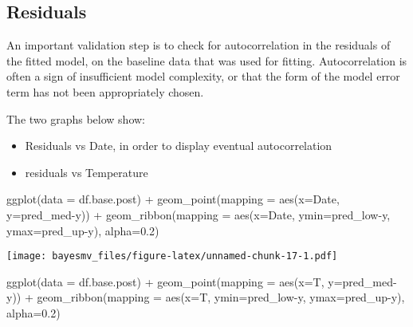 \documentclass[
]{article}
\newenvironment{Shaded}{\begin{snugshade}}{\end{snugshade}}
\newcommand{\AttributeTok}[1]{\textcolor[rgb]{0.77,0.63,0.00}{#1}}
\newcommand{\FloatTok}[1]{\textcolor[rgb]{0.00,0.00,0.81}{#1}}
\newcommand{\FunctionTok}[1]{\textcolor[rgb]{0.00,0.00,0.00}{#1}}
\newcommand{\NormalTok}[1]{#1}
\newcommand{\SpecialCharTok}[1]{\textcolor[rgb]{0.00,0.00,0.00}{#1}}
\providecommand{\tightlist}{%
  \setlength{\itemsep}{0pt}\setlength{\parskip}{0pt}}
\begin{document}
\hypertarget{residuals}{%
\subsection{Residuals}\label{residuals}}

An important validation step is to check for autocorrelation in the residuals of the fitted model, on the baseline data that was used for fitting. Autocorrelation is often a sign of insufficient model complexity, or that the form of the model error term has not been appropriately chosen.

The two graphs below show:

\begin{itemize}
\tightlist
\item
  Residuals vs Date, in order to display eventual autocorrelation
\item
  residuals vs Temperature
\end{itemize}

\begin{Shaded}
\begin{Highlighting}[]
\FunctionTok{ggplot}\NormalTok{(}\AttributeTok{data =}\NormalTok{ df.base.post) }\SpecialCharTok{+}
  \FunctionTok{geom\_point}\NormalTok{(}\AttributeTok{mapping =} \FunctionTok{aes}\NormalTok{(}\AttributeTok{x=}\NormalTok{Date, }\AttributeTok{y=}\NormalTok{pred\_med}\SpecialCharTok{{-}}\NormalTok{y)) }\SpecialCharTok{+}
  \FunctionTok{geom\_ribbon}\NormalTok{(}\AttributeTok{mapping =} \FunctionTok{aes}\NormalTok{(}\AttributeTok{x=}\NormalTok{Date, }\AttributeTok{ymin=}\NormalTok{pred\_low}\SpecialCharTok{{-}}\NormalTok{y, }\AttributeTok{ymax=}\NormalTok{pred\_up}\SpecialCharTok{{-}}\NormalTok{y), }\AttributeTok{alpha=}\FloatTok{0.2}\NormalTok{)}
\end{Highlighting}
\end{Shaded}

\texttt{[image: bayesmv\_files/figure-latex/unnamed-chunk-17-1.pdf]}

\begin{Shaded}
\begin{Highlighting}[]
\FunctionTok{ggplot}\NormalTok{(}\AttributeTok{data =}\NormalTok{ df.base.post) }\SpecialCharTok{+}
  \FunctionTok{geom\_point}\NormalTok{(}\AttributeTok{mapping =} \FunctionTok{aes}\NormalTok{(}\AttributeTok{x=}\NormalTok{T, }\AttributeTok{y=}\NormalTok{pred\_med}\SpecialCharTok{{-}}\NormalTok{y)) }\SpecialCharTok{+}
  \FunctionTok{geom\_ribbon}\NormalTok{(}\AttributeTok{mapping =} \FunctionTok{aes}\NormalTok{(}\AttributeTok{x=}\NormalTok{T, }\AttributeTok{ymin=}\NormalTok{pred\_low}\SpecialCharTok{{-}}\NormalTok{y, }\AttributeTok{ymax=}\NormalTok{pred\_up}\SpecialCharTok{{-}}\NormalTok{y), }\AttributeTok{alpha=}\FloatTok{0.2}\NormalTok{)}
\end{Highlighting}
\end{Shaded}
\end{document}
